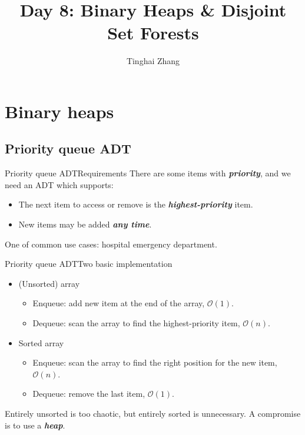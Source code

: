 \documentclass[aspectratio=169]{ctexbeamer}
\title{Day 8: Binary Heaps \& Disjoint Set Forests}
\author{Tinghai Zhang}
\newcommand{\highlight}[1]{\textbf{\textit{#1}}}
\begin{document}
    \begin{frame}
        \maketitle
    \end{frame}

    \section{Binary heaps}

    \subsection{Priority queue ADT}

    \begin{frame}{Priority queue ADT}{Requirements}
        There are some items with \highlight{priority}, and we need an ADT which supports:

        \begin{itemize}
            \item The next item to access or remove is the \highlight{highest-priority} item.
            \item New items may be added \highlight{any time}.
        \end{itemize}

        One of common use cases: hospital emergency department.
    \end{frame}

    \begin{frame}{Priority queue ADT}{Two basic implementation}
        \begin{itemize}
            \item (Unsorted) array
            \begin{itemize}
                \item Enqueue: add new item at the end of the array, $\mathcal O(1)$.
                \item Dequeue: scan the array to find the highest-priority item, $\mathcal O(n)$.
            \end{itemize}
            \item Sorted array
            \begin{itemize}
                \item Enqueue: scan the array to find the right position for the new item, $\mathcal O(n)$.
                \item Dequeue: remove the last item, $\mathcal O(1)$.
            \end{itemize}
        \end{itemize}
    
        Entirely unsorted is too chaotic, but entirely sorted is unnecessary. A compromise is to use a \highlight{heap}.
    \end{frame}
\end{document}
